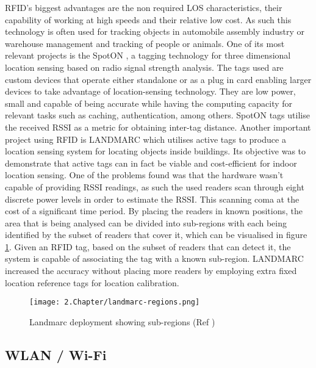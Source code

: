 \ac{RFID}'s biggest advantages are the non required \ac{LOS} characteristics, their capability of working at high speeds and their relative low cost. As such this technology is often used for tracking objects in automobile assembly industry or warehouse management and tracking of people or animals.
One of its most relevant projects is the SpotON \cite{spoton}, a tagging technology for three dimensional location sensing based on radio signal strength analysis. The tags used are custom devices that operate either standalone or as a plug in card enabling larger devices to take advantage of location-sensing technology. They are low power, small and capable of being accurate while having the computing capacity for relevant tasks such as caching, authentication, among others. SpotON tags utilise the received \ac{RSSI} as a metric for obtaining inter-tag distance.
Another important project using \ac{RFID} is LANDMARC\cite{landmarc} which utilises active tags to produce a location sensing system for locating objects inside buildings. Its objective was to demonstrate that active tags can in fact be viable and cost-efficient for indoor location sensing. One of the problems found was that the hardware wasn't capable of providing \ac{RSSI} readings, as such the used readers scan through eight discrete power levels in order to estimate the \ac{RSSI}. This scanning coma at the cost of a significant time period. By placing the readers in known positions, the area that is being analysed can be divided into sub-regions with each being identified by the subset of readers that cover it, which can be visualised in figure \ref{fig:land}. Given an RFID tag, based on the subset of readers that can detect it, the system is capable of associating the tag with a known sub-region. LANDMARC increased the accuracy without placing more
readers by employing extra fixed location reference tags for location calibration.

\begin{figure}[H]
	\centering
		\texttt{[image: 2.Chapter/landmarc-regions.png]}
	\caption[Landmarc deployment showing sub-regions (Ref \cite{landmarc}) ]{Landmarc deployment showing sub-regions (Ref \cite{landmarc})}
	\label{fig:land}
\end{figure}


\subsection{WLAN / Wi-Fi}
\label{subsec:wifi}

